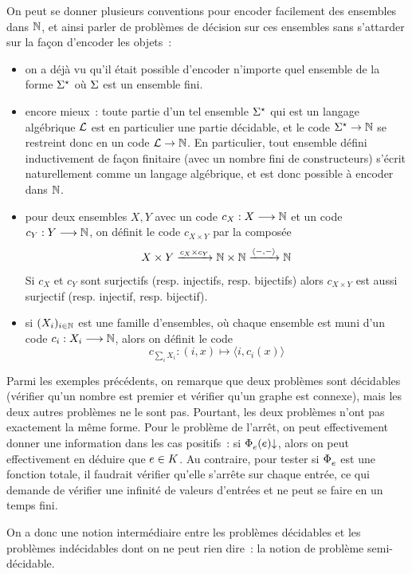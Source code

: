 On peut se donner plusieurs conventions pour encoder facilement des ensembles
dans $\mathbb N$, et ainsi parler de problèmes de décision sur ces ensembles sans
s'attarder sur la façon d'encoder les objets~:
\begin{itemize}
\item on a déjà vu qu'il était possible d'encoder n'importe quel ensemble de
  la forme $\Sigma^{\star}$ où $\Sigma$ est un ensemble fini.
\item encore mieux~: toute partie d'un tel ensemble $\Sigma^{\star}$ qui est un
  langage algébrique $\mathcal L$ est en particulier une partie décidable, et
  le code $\Sigma^{\star} \to \mathbb N$ se restreint donc en un code $\mathcal L \to \mathbb N$.
  En particulier, tout ensemble défini inductivement de façon finitaire
  (avec un nombre fini de constructeurs) s'écrit naturellement comme un langage
  algébrique, et est donc possible à encoder dans $\mathbb N$.
\item pour deux ensembles $X,Y$ avec un code $c_X : \displaystyle X \longrightarrow \mathbb N$ et un
  code $c_Y : \displaystyle Y \longrightarrow \mathbb N$, on définit le code $c_{X\times Y}$ par la
  composée
  \[X \times Y \xrightarrow{c_X \times c_Y} \mathbb N \times \mathbb N
  \xrightarrow{\langle -,-\rangle} \mathbb N\]
  Si $c_X$ et $c_Y$ sont surjectifs (resp. injectifs, resp. bijectifs) alors
  $c_{X\times Y}$ est aussi surjectif (resp. injectif, resp. bijectif).
\item si $(X_i)_{i \in \mathbb N}$ est une famille d'ensembles, où chaque ensemble est
  muni d'un code $c_i : \displaystyle X_i \longrightarrow \mathbb N$, alors on définit le code
  \[c_{\sum_i X_i} : (i,x) \longmapsto \langle i,c_i(x)\rangle\]
\end{itemize}

Parmi les exemples précédents, on remarque que deux problèmes sont décidables
(vérifier qu'un nombre est premier et vérifier qu'un graphe est connexe), mais
les deux autres problèmes ne le sont pas. Pourtant, les deux problèmes n'ont
pas exactement la même forme. Pour le problème de l'arrêt, on peut effectivement
donner une information dans les cas positifs~: si $\operatorname{\Phi}_{e}^{}(e)\mathbin{\downarrow}$, alors
on peut effectivement en déduire que $e \in K$. Au contraire, pour tester si
$\operatorname{\Phi}_{e}^{}$ est une fonction totale, il faudrait vérifier qu'elle s'arrête sur
chaque entrée, ce qui demande de vérifier une infinité de valeurs d'entrées et
ne peut se faire en un temps fini.

On a donc une notion intermédiaire entre les problèmes décidables et les
problèmes indécidables dont on ne peut rien dire~: la notion de problème
semi-décidable.

